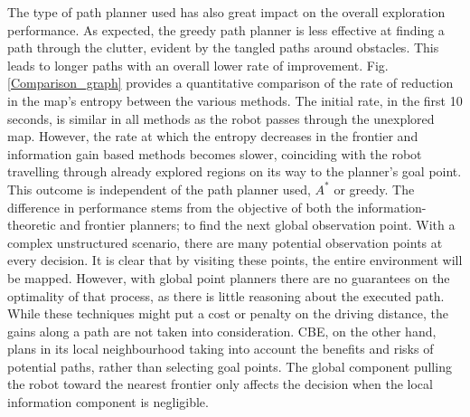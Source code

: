 \documentclass[shortAfour,sageh,times]{sagej_no_sage}
\begin{document}
The type of path planner used has also great impact on the overall exploration performance. As expected, the greedy path planner is less effective at finding a path through the clutter, evident by the tangled paths around obstacles. This leads to longer paths with an overall lower rate of improvement. Fig. \ref{Comparison_graph} provides a quantitative comparison of the rate of reduction in the map's entropy between the various methods. The initial rate, in the first 10 seconds, is similar in all methods as the robot passes through the unexplored map. However, the rate at which the entropy decreases in the frontier and information gain based methods becomes slower, coinciding with the robot travelling through already explored regions on its way to the planner's goal point. This outcome is independent of the path planner used,  $A^*$ or greedy. The difference in performance stems from the objective of both the information-theoretic and frontier planners; to find the next global observation point. With a complex unstructured scenario, there are many potential observation points at every decision. It is clear that by visiting these points, the entire environment will be mapped. However, with global point planners there are no guarantees on the optimality of that process, as there is little reasoning about the executed path. While these techniques might put a cost or penalty on the driving distance, the gains along a path are not taken into consideration. CBE, on the other hand, plans in its local neighbourhood taking into account the benefits and risks of potential paths, rather than selecting goal points. The global component pulling the robot toward the nearest frontier only affects the decision when the local information component is negligible. 
\end{document}
